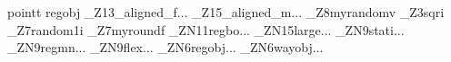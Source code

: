 pointt
regobj
_Z13_aligned_f...
_Z15_aligned_m...
_Z8myrandomv
_Z3sqri
_Z7random1i
_Z7myroundf
_ZN11regbo...
_ZN15large...
_ZN9stati...
_ZN9regmn...
_ZN9flex...
_ZN6regobj...
_ZN6wayobj...
